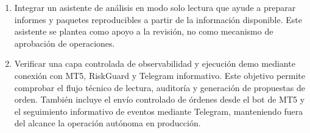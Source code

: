 \begin{enumerate}
    \item Integrar un asistente de an\'alisis en modo solo lectura que ayude a
    preparar informes y paquetes reproducibles a partir de la informaci\'on
    disponible. Este asistente se plantea como apoyo a la revisi\'on, no como
    mecanismo de aprobaci\'on de operaciones.

    \item Verificar una capa controlada de observabilidad y ejecuci\'on demo mediante
    conexi\'on con MT5, RiskGuard y Telegram informativo. Este objetivo permite
    comprobar el flujo t\'ecnico de lectura, auditor\'ia y generaci\'on de propuestas de orden.
    Tambi\'en incluye el env\'io controlado de \'ordenes desde el bot de MT5 y el
    seguimiento informativo de eventos mediante Telegram, manteniendo fuera del
    alcance la operaci\'on aut\'onoma en producci\'on.
\end{enumerate}

